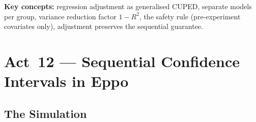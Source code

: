 \documentclass[12pt, a4paper]{article}
\begin{document}
\begin{keytakeaway}
\textbf{Key concepts:} regression adjustment as generalised CUPED, separate
models per group, variance reduction factor $1 - R^2$, the safety rule
(pre-experiment covariates only), adjustment preserves the sequential
guarantee.
\end{keytakeaway}


\newpage
\section{Act~12 --- Sequential Confidence Intervals in Eppo}

\subsection{The Simulation}
\end{document}
